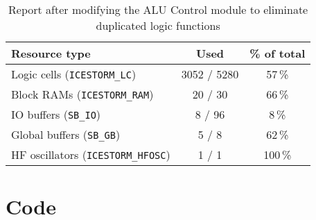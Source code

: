 \documentclass[a4paper,10pt]{article}
\begin{document}
\begin{table}[H] 
    \centering
    \begin{tabularx}{0.6\textwidth}{X c c}
        \toprule
        Resource type & Used & \% of total \\ \midrule
        Logic cells (\texttt{ICESTORM\_LC}) & 3052 / 5280 & 57\,\% \\
        Block RAMs (\texttt{ICESTORM\_RAM}) & 20 / 30 & 66\,\% \\
        IO buffers (\texttt{SB\_IO}) & 8 / 96 & 8\,\% \\
        Global buffers (\texttt{SB\_GB}) & 5 / 8 & 62\,\% \\
        HF oscillators (\texttt{ICESTORM\_HFOSC}) & 1 / 1 & 100\,\% \\
        \bottomrule
    \end{tabularx}
    \caption{Report after modifying the ALU Control module
    to eliminate duplicated logic functions}
    \label{tab:ALU}
\end{table}

\section{Code}

%
\end{document}
